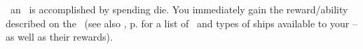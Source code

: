 \activating\ an \armament\ is accomplished by spending die.
You immediately gain the reward/ability described on the \planetsheet\ 
(see also , p.\pageref{sec:armaments} for a list of 
\armaments\ and types of ships available to your \armaments--as well as their 
rewards).
